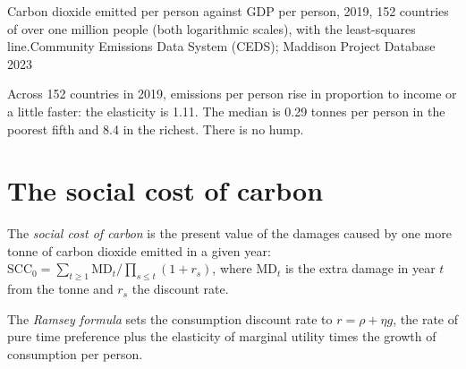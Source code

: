 \begin{omchart}{Carbon dioxide emitted per person against GDP per person, 2019, 152 countries
of over one million people (both logarithmic scales), with the least-squares line.}{Community
Emissions Data System (CEDS); Maddison Project Database 2023}
\end{omchart}

Across 152 countries in 2019, emissions per person rise in proportion to income or a little faster:
the elasticity is 1.11. The median is 0.29 tonnes per person in the poorest fifth and 8.4 in the richest.
There is no hump.

\section{The social cost of carbon}\label{sec:b3:environmental-and-resource-economics:scc}

\begin{definition}\label{def:b3:environmental-and-resource-economics:scc}
The \emph{social cost of carbon} is the present value of the damages caused by one
more tonne of carbon dioxide emitted in a given year: $\mathrm{SCC}_0 = \sum_{t \ge 1} \mathrm{MD}_t/\prod_{s \le t}(1 + r_s)$, where $\mathrm{MD}_t$ is the extra
damage in year $t$ from the tonne and $r_s$ the discount rate.
\end{definition}

\begin{definition}\label{def:b3:environmental-and-resource-economics:ramsey-discount}
The \emph{Ramsey formula} sets the consumption discount rate to $r = \rho + \eta g$, the rate of pure time
preference plus the elasticity of marginal utility times the growth of consumption
per person.
\end{definition}

